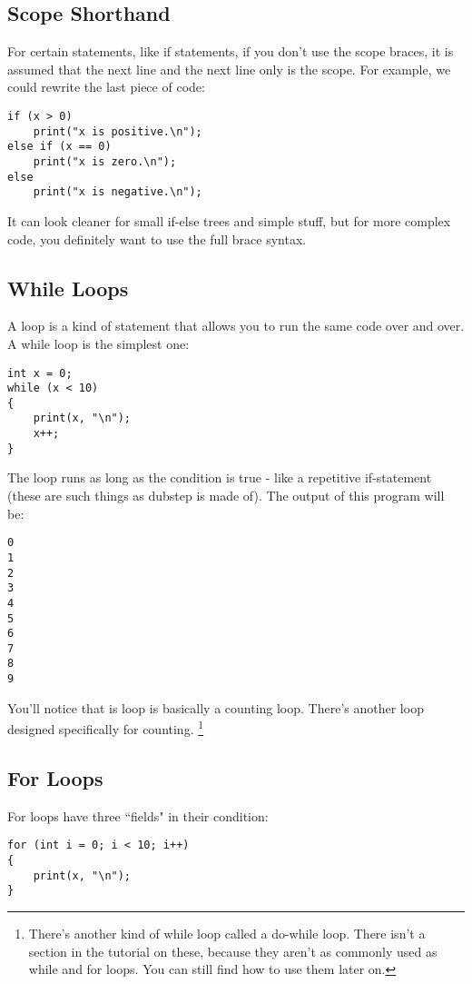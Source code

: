 \documentclass[10pt,a4paper]{article}
\begin{document}
\subsection{Scope Shorthand}
For certain statements, like if statements, if you don't use the scope braces, it is assumed that the next line and the next line only is the scope. For example, we could rewrite the last piece of code:
\begin{verbatim}
if (x > 0)
    print("x is positive.\n");
else if (x == 0)
    print("x is zero.\n");
else
    print("x is negative.\n");
\end{verbatim}

It can look cleaner for small if-else trees and simple stuff, but for more complex code, you definitely want to use the full brace syntax.

\newpage




\subsection{While Loops}
A loop is a kind of statement that allows you to run the same code over and over. A while loop is the simplest one:
\begin{verbatim}
int x = 0;
while (x < 10)
{
    print(x, "\n");
    x++;
}
\end{verbatim}

The loop runs as long as the condition is true - like a repetitive if-statement (these are such things as dubstep is made of). The output of this program will be:
\begin{verbatim}
0
1
2
3
4
5
6
7
8
9
\end{verbatim}

You'll notice that is loop is basically a counting loop. There's another loop designed specifically for counting. \footnote{There's another kind of while loop called a do-while loop. There isn't a section in the tutorial on these, because they aren't as commonly used as while and for loops. You can still find how to use them later on.}

\newpage




\subsection{For Loops}
For loops have three ``fields" in their condition:
\begin{verbatim}
for (int i = 0; i < 10; i++)
{
    print(x, "\n");
}
\end{verbatim}
\end{document}
